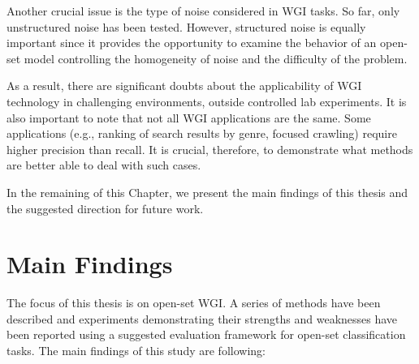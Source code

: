 Another crucial issue is the type of noise considered in WGI tasks. So far, only unstructured noise has been tested. However, structured noise is equally important since it provides the opportunity to examine the behavior of an open-set model controlling the homogeneity of noise and the difficulty of the problem. 

As a result, there are significant doubts about the applicability of WGI technology in challenging environments, outside controlled lab experiments. It is also important to note that not all WGI applications are the same. Some applications (e.g., ranking of search results by genre, focused crawling) require higher precision than recall. It is crucial, therefore, to demonstrate what methods are better able to deal with such cases.

In the remaining of this Chapter, we present the main findings of this thesis and the suggested direction for future work.

\section{Main Findings}

The focus of this thesis is on open-set WGI. A series of methods have been described and experiments demonstrating their strengths and weaknesses have been reported using a suggested evaluation framework for open-set classification tasks. The main findings of this study are following:

